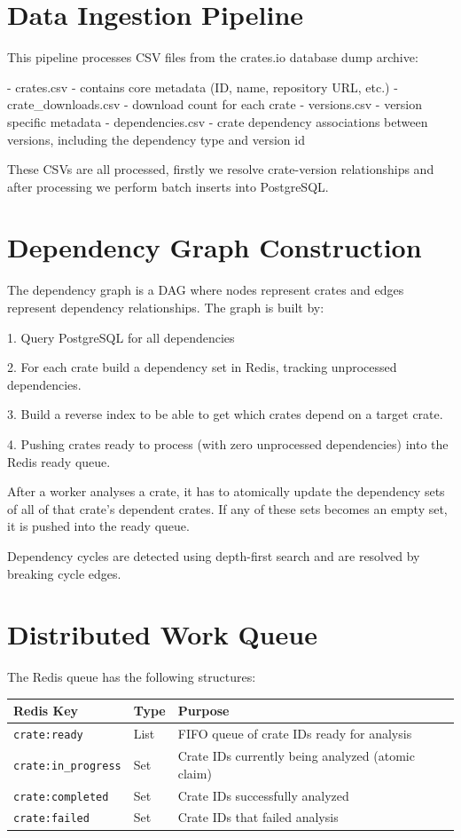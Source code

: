 \section{Data Ingestion Pipeline}\label{sect:data-pipeline}

This pipeline processes CSV files from the crates.io database dump archive:

- crates.csv - contains core metadata (ID, name, repository URL, etc.)
- crate\_downloads.csv - download count for each crate
- versions.csv - version specific metadata
- dependencies.csv - crate dependency associations between versions, including the dependency type and version id

These CSVs are all processed, firstly we resolve crate-version relationships and after processing we perform batch inserts into PostgreSQL.

\section{Dependency Graph Construction}\label{sect:dep-graph}

The dependency graph is a DAG where nodes represent crates and edges represent dependency relationships.
The graph is built by:

1. Query PostgreSQL for all dependencies

2. For each crate build a dependency set in Redis, 
tracking unprocessed dependencies.

3. Build a reverse index to be able to get which crates depend on a target crate.

4. Pushing crates ready to process (with zero unprocessed dependencies) into the Redis ready queue.

After a worker analyses a crate, it has to atomically update the dependency sets of all of that crate's dependent crates. If any of these sets becomes an empty set, it is pushed into the ready queue.

Dependency cycles are detected using depth-first search and are resolved by breaking cycle edges.

\section{Distributed Work Queue}\label{sect:work-queue}

The Redis queue has the following structures:

\begin{tabular}{|l|l|l|}
\hline
\textbf{Redis Key} & \textbf{Type} & \textbf{Purpose} \\
\hline
\texttt{crate:ready} & List & FIFO queue of crate IDs ready for analysis \\
\hline
\texttt{crate:in\_progress} & Set & Crate IDs currently being analyzed (atomic claim) \\
\hline
\texttt{crate:completed} & Set & Crate IDs successfully analyzed \\
\hline
\texttt{crate:failed} & Set & Crate IDs that failed analysis \\
\hline
\end{tabular}

